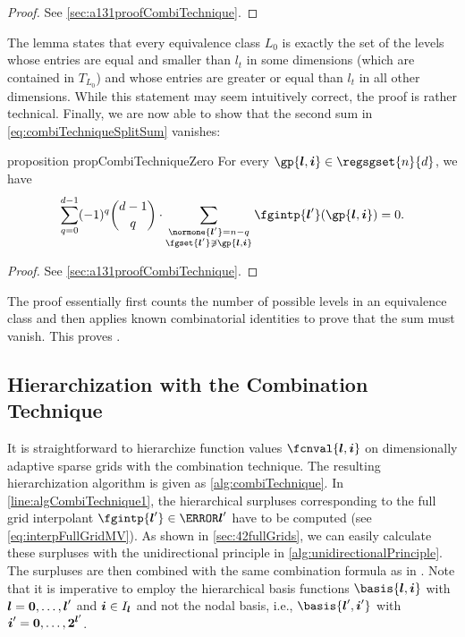 \begin{proof}
  See \cref{sec:a131proofCombiTechnique}.
\end{proof}

The lemma states that every equivalence class $L_0$ is exactly the
set of the levels whose entries are equal
and smaller than $l_t$ in some dimensions
(which are contained in $T_{L_0}$)
and whose entries are greater or equal than $l_t$ in all other dimensions.
While this statement may seem intuitively correct,
the proof is rather technical.
Finally, we are now able to show that the second sum in
\eqref{eq:combiTechniqueSplitSum} vanishes:

\begin{restatable}{%
  proposition%
}{%
  propCombiTechniqueZero%
}
  \label{prop:combiTechniqueZero}
  For every $\gp{\*l,\*i} \in \regsgset{n}{d}$, we have
  \begin{equation}
    \sum_{q=0}^{d-1} (-1)^q \binom{d-1}{q} \cdot
    \sum_{\substack{\normone{\*l'} = n - q\\\fgset{\*l'} \notni \gp{\*l,\*i}}}
    \fgintp{\*l'}(\gp{\*l,\*i})
    = 0.
  \end{equation}
\end{restatable}

\begin{proof}
  See \cref{sec:a131proofCombiTechnique}.
\end{proof}

The proof essentially first counts the number of possible levels in
an equivalence class and then applies known combinatorial identities
to prove that the sum must vanish.
This proves .



\subsection{Hierarchization with the Combination Technique}
\label{sec:432hierarchizationCombiTechnique}

It is straightforward to hierarchize function values
$\fcnval{\*l,\*i}$ on dimensionally adaptive sparse grids
with the combination technique.
The resulting hierarchization algorithm is given as \cref{alg:combiTechnique}.
In \cref{line:algCombiTechnique1},
the hierarchical surpluses corresponding to the full grid
interpolant $\fgintp{\*l'} \in \ns{\*l'}$ have to be computed
(see \eqref{eq:interpFullGridMV}).
As shown in \cref{sec:42fullGrids}, we can easily calculate these
surpluses with the unidirectional principle in
\cref{alg:unidirectionalPrinciple}.
The surpluses are then combined with the same combination formula
as in .
Note that it is imperative to employ the hierarchical basis functions
$\basis{\*l,\*i}$ with ${\boldsymbol{l}} = {\boldsymbol{0}}, \dotsc, {\boldsymbol{l}}'$ and ${\boldsymbol{i}} \in I_{{\boldsymbol{l}}}$
and not the nodal basis,
i.e., $\basis{\*l',\*i'}$ with ${\boldsymbol{i}}' = {\boldsymbol{0}}, \dotsc, {\boldsymbol{2}}^{{\boldsymbol{l}}'}$.

